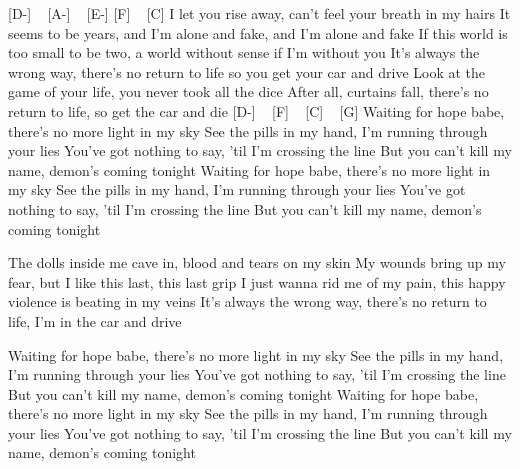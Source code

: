 
[D-] ~ [A-] ~ [E-] [F] ~ [C]
I let you rise away, can't feel your breath in my hairs
It seems to be years, and I'm alone and fake, and I'm alone and fake
If this world is too small to be two, a world without sense if I'm without you
It's always the wrong way, there's no return to life so you get your car and drive
Look at the game of your life, you never took all the dice
After all, curtains fall, there's no return to life, so get the car and die
[D-] ~ [F] ~ [C] ~ [G]
Waiting for hope babe, there's no more light in my sky
See the pills in my hand, I'm running through your lies
You've got nothing to say, 'til I'm crossing the line
But you can't kill my name, demon's coming tonight
Waiting for hope babe, there's no more light in my sky
See the pills in my hand, I'm running through your lies
You've got nothing to say, 'til I'm crossing the line
But you can't kill my name, demon's coming tonight

The dolls inside me cave in, blood and tears on my skin
My wounds bring up my fear, but I like this last, this last grip
I just wanna rid me of my pain, this happy violence is beating in my veins
It's always the wrong way, there's no return to life, I'm in the car and drive

Waiting for hope babe, there's no more light in my sky
See the pills in my hand, I'm running through your lies
You've got nothing to say, 'til I'm crossing the line
But you can't kill my name, demon's coming tonight
Waiting for hope babe, there's no more light in my sky
See the pills in my hand, I'm running through your lies
You've got nothing to say, 'til I'm crossing the line
But you can't kill my name, demon's coming tonight
